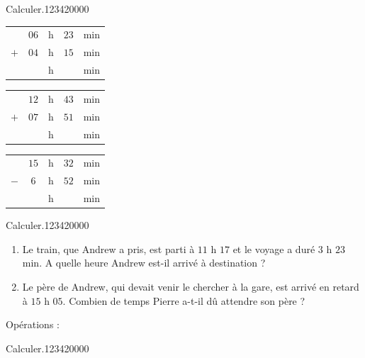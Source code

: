 \begin{pageAuto}
\begin{ExoAuto}{ Calculer.}{1234}{2}{0}{0}{0}{0}
\begin{minipage}{0.30\linewidth}
\begin{tabular}{ccccc} 
& $06$ & h &  $23$ & min \\ 
$+$   & $04$ & h & $15$  & min\\ 
\hline 
   &  & h & & min\\
\end{tabular} 
\end{minipage}
\hfill 
\begin{minipage}{0.30\linewidth}
 \begin{tabular}{ccccc} 
& $12$ & h &  $43$ & min \\ 
$+$   & $07$ & h &  $51$ & min\\ 
\hline 
   &  & h & & min\\
\end{tabular} 
\end{minipage}
\hfill 
\begin{minipage}{0.30\linewidth}
 \begin{tabular}{ccccc} 
& $15$ & h & $32$  & min \\ 
$-$   & $6$ & h & $52$ & min\\ 
\hline 
   &  & h & & min\\
\end{tabular} 
\end{minipage}

\end{ExoAuto}
\begin{ExoAuto}{ Calculer.}{1234}{2}{0}{0}{0}{0}

\begin{minipage}{0.680\linewidth}
\begin{enumerate}
\item Le train, que Andrew a pris, est parti à $11$ h $17$ et le voyage a duré $3$ h $23$ min.
A quelle heure Andrew est-il arrivé à destination ? 


\item Le père de Andrew, qui devait venir le chercher à la gare, est arrivé en retard à $15$ h $05$.
Combien de temps Pierre a-t-il dû attendre son père ?
\end{enumerate}
\end{minipage}
\hfill \vrule \hfill 
\begin{minipage}{0.30\linewidth}Opérations :
\vspace{3cm}
\end{minipage}

\end{ExoAuto}
\begin{ExoAuto}{ Calculer.}{1234}{2}{0}{0}{0}{0}



\end{ExoAuto}
\end{pageAuto}
